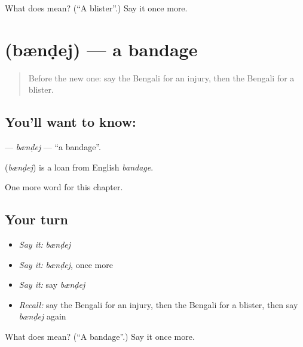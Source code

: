 \begin{tcolorbox}[breakable,colback=teal!4,colframe=teal!35!black,title={Before you move on}]
What does  mean? (\textquotedblleft{}A blister\textquotedblright{}.) Say it once more.
\end{tcolorbox}
\section[\texorpdfstring{\bn{ব্যান্ডেজ} (bænḍej)}{ব্যান্ডেজ (bænḍej)}]{ (bænḍej) — a bandage}

\label{lesson:BN-C185-bndej}



\begin{quote}
Before the new one: say the Bengali for an injury, then the Bengali for a blister.
\end{quote}

\subsection*{You'll want to know: }
\textbf{} — \emph{bænḍej} — \textquotedblleft{}a bandage\textquotedblright{}.

\begin{cousinweb}
\textbf{} (\emph{bænḍej}) is a loan from English \emph{bandage}.
\end{cousinweb}

\begin{grammarlens}[title={What you've built}]
One more word for this chapter.
\end{grammarlens}

\subsection*{Your turn}
\begin{itemize}
\raggedright
  \item \emph{Say it:} \emph{bænḍej}
  \item \emph{Say it:} \emph{bænḍej}, once more
  \item \emph{Say it:} say \emph{bænḍej}
  \item \emph{Recall:} say the Bengali for an injury, then the Bengali for a blister, then say \emph{bænḍej} again
\end{itemize}

\begin{tcolorbox}[breakable,colback=teal!4,colframe=teal!35!black,title={Before you move on}]
What does  mean? (\textquotedblleft{}A bandage\textquotedblright{}.) Say it once more.
\end{tcolorbox}
